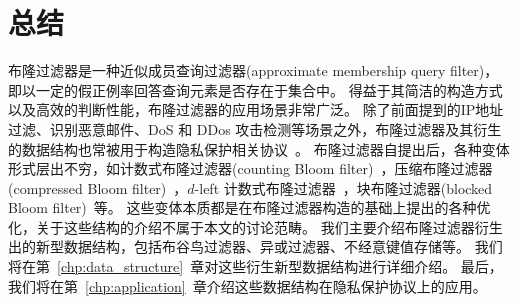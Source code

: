 \section{总结}

布隆过滤器是一种近似成员查询过滤器(approximate membership query filter)，即以一定的假正例率回答查询元素是否存在于集合中。
得益于其简洁的构造方式以及高效的判断性能，布隆过滤器的应用场景非常广泛。
除了前面提到的IP地址过滤、识别恶意邮件、DoS 和 DDos 攻击检测等场景之外，布隆过滤器及其衍生的数据结构也常被用于构造隐私保护相关协议~\cite{zhang2024survey}。
布隆过滤器自提出后，各种变体形式层出不穷，如计数式布隆过滤器(counting Bloom filter)~\cite{lifan2000summary}，压缩布隆过滤器(compressed Bloom filter)~\cite{mitzenmacher2002compressed}，$d$-left 计数式布隆过滤器~\cite{bonomi2006improved}，块布隆过滤器(blocked Bloom filter)~\cite{putze2009cache}等。
这些变体本质都是在布隆过滤器构造的基础上提出的各种优化，关于这些结构的介绍不属于本文的讨论范畴。
我们主要介绍布隆过滤器衍生出的新型数据结构，包括布谷鸟过滤器、异或过滤器、不经意键值存储等。
我们将在第~\ref{chp:data_structure}~章对这些衍生新型数据结构进行详细介绍。
最后，我们将在第~\ref{chp:application}~章介绍这些数据结构在隐私保护协议上的应用。
